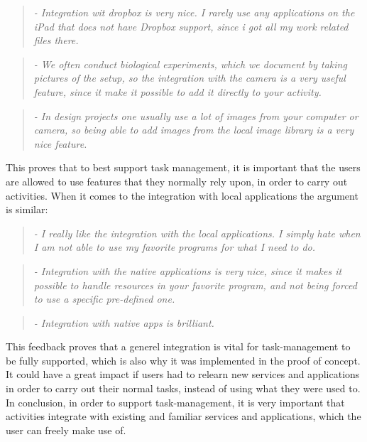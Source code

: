 	\begin{quotation}
		\emph{
			- Integration wit dropbox is very nice. I rarely use any applications on the iPad that does not have Dropbox support, since i got all my work related files there.
		}
	\end{quotation}

	\begin{quotation}
		\emph{
			- We often conduct biological experiments, which we document by taking pictures of the setup, so the integration with the camera is a very useful feature, since it make it possible to add it directly to your activity.
		}
	\end{quotation}
	
	\begin{quotation}
		\emph{
			- In design projects one usually use a lot of images from your computer or camera, so being able to add images from the local image library is a very nice feature.
		}
	\end{quotation}
	
	This proves that to best support task management, it is important that the users are allowed to use features that they normally rely upon, in order to carry out activities. When it comes to the integration with local applications the argument is similar:
	
	\begin{quotation}
		\emph{
			- I really like the integration with the local applications. I simply hate when I am not able to use my favorite programs for what I need to do.
		}
	\end{quotation}
	
	\begin{quotation}
		\emph{-	Integration with the native applications is very nice, since it makes it possible to handle resources in your favorite program, and not being forced to use a specific pre-defined one.}
	\end{quotation}
	
	\begin{quotation}
		\emph{-	Integration with native apps is brilliant.}
	\end{quotation}

	This feedback proves that a generel integration is vital for task-management to be fully supported, which is also why it was implemented in the proof of concept. It could have a great impact if users had to relearn new services and applications in order to carry out their normal tasks, instead of using what they were used to. In conclusion, in order to support task-management, it is very important that activities integrate with existing and familiar services and applications, which the user can freely make use of.

